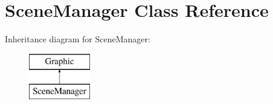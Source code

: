 \hypertarget{class_scene_manager}{}\section{Scene\+Manager Class Reference}
\label{class_scene_manager}
Inheritance diagram for Scene\+Manager\+:\begin{figure}[H]
\begin{center}
\leavevmode
\includegraphics[height=2.000000cm]{class_scene_manager}
\end{center}
\end{figure}

